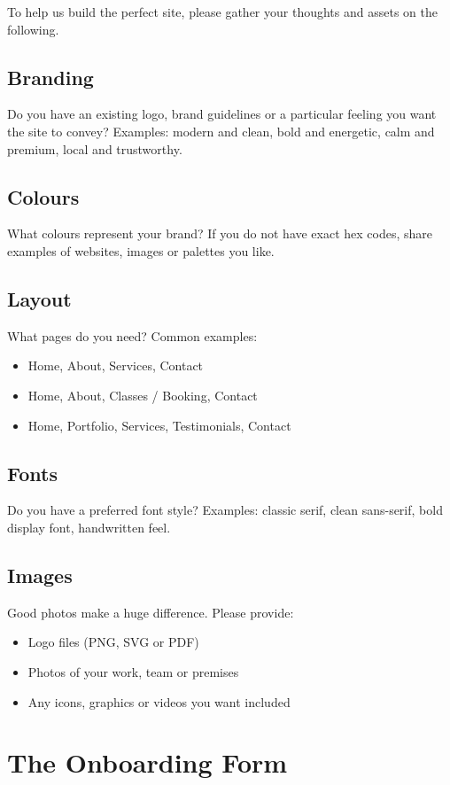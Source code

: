 \documentclass[11pt,a4paper]{article}
\begin{document}
To help us build the perfect site, please gather your thoughts and assets on the following.

\subsection{Branding}
Do you have an existing logo, brand guidelines or a particular feeling you want the site to convey? Examples: modern and clean, bold and energetic, calm and premium, local and trustworthy.

\subsection{Colours}
What colours represent your brand? If you do not have exact hex codes, share examples of websites, images or palettes you like.

\subsection{Layout}
What pages do you need? Common examples:
\begin{itemize}[leftmargin=*]
    \item Home, About, Services, Contact
    \item Home, About, Classes / Booking, Contact
    \item Home, Portfolio, Services, Testimonials, Contact
\end{itemize}

\subsection{Fonts}
Do you have a preferred font style? Examples: classic serif, clean sans-serif, bold display font, handwritten feel.

\subsection{Images}
Good photos make a huge difference. Please provide:
\begin{itemize}[leftmargin=*]
    \item Logo files (PNG, SVG or PDF)
    \item Photos of your work, team or premises
    \item Any icons, graphics or videos you want included
\end{itemize}

\section{The Onboarding Form}
\end{document}
